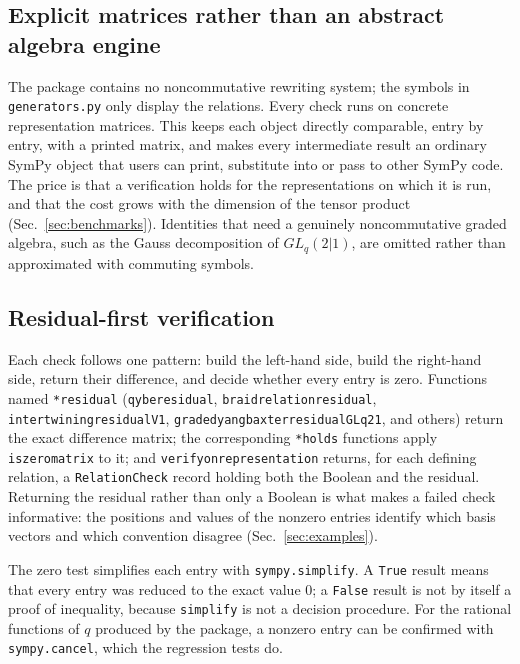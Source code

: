 \documentclass{SciPost}
\newcommand{\code}[1]{\texttt{\begingroup\def\_{\textunderscore\allowbreak}#1\endgroup}}
\newcommand{\GL}{GL_q(2|1)}
\begin{document}
\subsection{Explicit matrices rather than an abstract algebra engine}

The package contains no noncommutative rewriting system; the symbols in \code{generators.py} only display the relations. Every check runs on concrete representation matrices. This keeps each object directly comparable, entry by entry, with a printed matrix, and makes every intermediate result an ordinary SymPy object that users can print, substitute into or pass to other SymPy code. The price is that a verification holds for the representations on which it is run, and that the cost grows with the dimension of the tensor product (Sec.~\ref{sec:benchmarks}). Identities that need a genuinely noncommutative graded algebra, such as the Gauss decomposition of $\GL$, are omitted rather than approximated with commuting symbols.

\subsection{Residual-first verification}
\label{sec:residual}

Each check follows one pattern: build the left-hand side, build the right-hand side, return their difference, and decide whether every entry is zero. Functions named \code{*\_residual} (\code{qybe\_residual}, \code{braid\_relation\_residual}, \code{intertwining\_residual\_V1}, \code{graded\_yang\_baxter\_residual\_GLq21}, and others) return the exact difference matrix; the corresponding \code{*\_holds} functions apply \code{is\_zero\_matrix} to it; and \code{verify\_on\_representation} returns, for each defining relation, a \code{RelationCheck} record holding both the Boolean and the residual. Returning the residual rather than only a Boolean is what makes a failed check informative: the positions and values of the nonzero entries identify which basis vectors and which convention disagree (Sec.~\ref{sec:examples}).

The zero test simplifies each entry with \code{sympy.simplify}. A \code{True} result means that every entry was reduced to the exact value 0; a \code{False} result is not by itself a proof of inequality, because \code{simplify} is not a decision procedure. For the rational functions of $q$ produced by the package, a nonzero entry can be confirmed with \code{sympy.cancel}, which the regression tests do.
\end{document}
